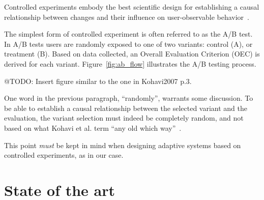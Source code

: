 Controlled experiments embody the best scientific design for establishing a causal relationship between changes and their influence on user-observable behavior~\cite{Kohavi2007,Kohavi2008}.

The simplest form of controlled experiment is often referred to as the A/B test. In A/B tests users are randomly exposed to one of two variants: control (A), or treatment (B). Based on data collected, an Overall Evaluation Criterion (OEC) is derived for each variant. Figure~\ref{fig:ab_flow} illustrates the A/B testing process.

@TODO: Insert figure similar to the one in Kohavi2007 p.3.

One word in the previous paragraph, ``randomly'', warrants some discussion. To be able to establish a causal relationship between the selected variant and the evaluation, the variant selection must indeed be completely random, and not based on what Kohavi et al. term ``any old which way''~\cite{Kohavi2007}.

This point \emph{must} be kept in mind when designing adaptive systems based on controlled experiments, as in our case.

\section{State of the art}
\label{survey:sub:state_of_the_art}



